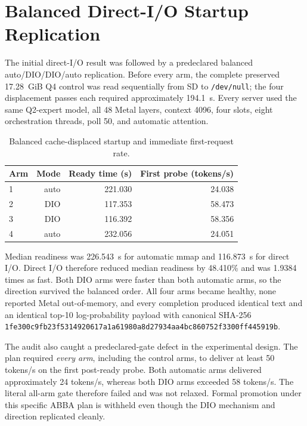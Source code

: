 \section{Balanced Direct-I/O Startup Replication}
\label{sec:qwen30b-dio-abba}

The initial direct-I/O result was followed by a predeclared balanced
auto/DIO/DIO/auto replication.  Before every arm, the complete preserved
17.28~GiB Q4 control was read sequentially from SD to \texttt{/dev/null}; the
four displacement passes each required approximately 194.1~s.  Every server
used the same Q2-expert model, all 48 Metal layers, context 4096, four slots,
eight orchestration threads, poll 50, and automatic attention.

\begin{table}[ht]
\centering
\begin{tabular}{lrrr}
\toprule
Arm & Mode & Ready time (s) & First probe (tokens/s) \\
\midrule
1 & auto & 221.030 & 24.038 \\
2 & DIO  & 117.353 & 58.473 \\
3 & DIO  & 116.392 & 58.356 \\
4 & auto & 232.056 & 24.051 \\
\bottomrule
\end{tabular}
\caption{Balanced cache-displaced startup and immediate first-request rate.}
\end{table}

Median readiness was 226.543~s for automatic mmap and 116.873~s for direct
I/O.  Direct I/O therefore reduced median readiness by 48.410\% and was
1.9384 times as fast.  Both DIO arms were faster than both automatic arms, so
the direction survived the balanced order.  All four arms became healthy,
none reported Metal out-of-memory, and every completion produced identical
text and an identical top-10 log-probability payload with canonical SHA-256
\texttt{1fe300c9fb23f5314920617a1a61980a8d27934aa4bc860752f3300ff445919b}.

The audit also caught a predeclared-gate defect in the experimental design.
The plan required \emph{every arm}, including the control arms, to deliver at
least 50 tokens/s on the first post-ready probe.  Both automatic arms delivered
approximately 24 tokens/s, whereas both DIO arms exceeded 58 tokens/s.  The
literal all-arm gate therefore failed and was not relaxed.  Formal promotion
under this specific ABBA plan is withheld even though the DIO mechanism and
direction replicated cleanly.

